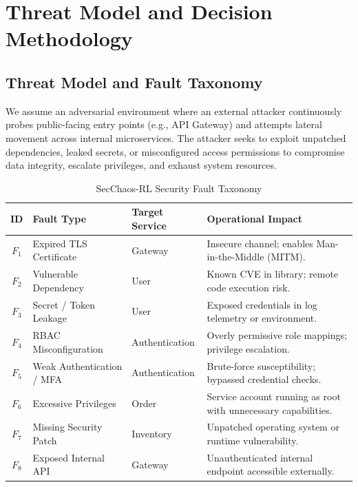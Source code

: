 \documentclass[11pt,a4paper]{article}
\begin{document}
\section{Threat Model and Decision Methodology}
\label{sec:methodology}

\subsection{Threat Model and Fault Taxonomy}
We assume an adversarial environment where an external attacker continuously probes public-facing entry points (e.g., API Gateway) and attempts lateral movement across internal microservices. The attacker seeks to exploit unpatched dependencies, leaked secrets, or misconfigured access permissions to compromise data integrity, escalate privileges, and exhaust system resources.

\begin{table}[!t]
\centering
\small
\caption{SecChaos-RL Security Fault Taxonomy}
\label{tab:fault_categories}
\begin{tabular}{cllp{4.2cm}}
\toprule
\textbf{ID} & \textbf{Fault Type} & \textbf{Target Service} & \textbf{Operational Impact} \\
\midrule
$F_1$ & Expired TLS Certificate & Gateway & Insecure channel; enables Man-in-the-Middle (MITM). \\
$F_2$ & Vulnerable Dependency & User & Known CVE in library; remote code execution risk. \\
$F_3$ & Secret / Token Leakage & User & Exposed credentials in log telemetry or environment. \\
$F_4$ & RBAC Misconfiguration & Authentication & Overly permissive role mappings; privilege escalation. \\
$F_5$ & Weak Authentication / MFA & Authentication & Brute-force susceptibility; bypassed credential checks. \\
$F_6$ & Excessive Privileges & Order & Service account running as root with unnecessary capabilities. \\
$F_7$ & Missing Security Patch & Inventory & Unpatched operating system or runtime vulnerability. \\
$F_8$ & Exposed Internal API & Gateway & Unauthenticated internal endpoint accessible externally. \\
\bottomrule
\end{tabular}
\end{table}
\end{document}
